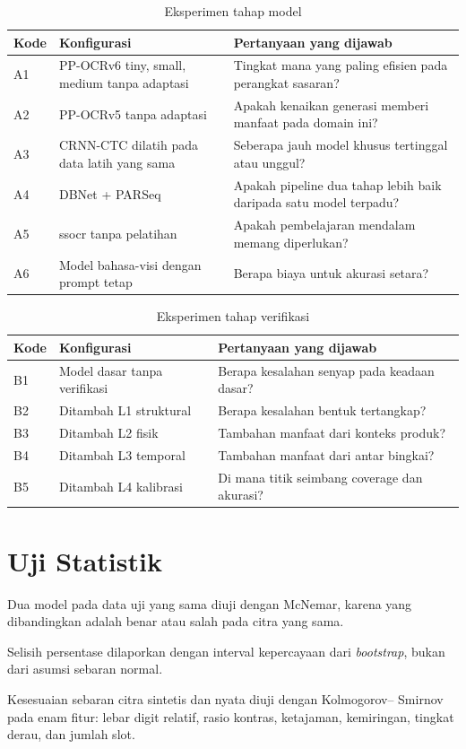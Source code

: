 \documentclass[12pt,a4paper,oneside]{report}
\begin{document}
\begin{table}[H]
\caption{Eksperimen tahap model}
\label{tab:eks-a}
\begin{tabularx}{\textwidth}{@{}L{1.0cm} L{5.6cm} X@{}}
\toprule
\textbf{Kode} & \textbf{Konfigurasi} & \textbf{Pertanyaan yang dijawab} \\
\midrule
A1 & PP-OCRv6 tiny, small, medium tanpa adaptasi & Tingkat mana yang paling efisien pada perangkat sasaran? \\
A2 & PP-OCRv5 tanpa adaptasi & Apakah kenaikan generasi memberi manfaat pada domain ini? \\
A3 & CRNN-CTC dilatih pada data latih yang sama & Seberapa jauh model khusus tertinggal atau unggul? \\
A4 & DBNet + PARSeq & Apakah pipeline dua tahap lebih baik daripada satu model terpadu? \\
A5 & ssocr tanpa pelatihan & Apakah pembelajaran mendalam memang diperlukan? \\
A6 & Model bahasa-visi dengan prompt tetap & Berapa biaya untuk akurasi setara? \\
\bottomrule
\end{tabularx}
\end{table}

\begin{table}[H]
\caption{Eksperimen tahap verifikasi}
\label{tab:eks-b}
\begin{tabularx}{\textwidth}{@{}L{1.0cm} L{5.6cm} X@{}}
\toprule
\textbf{Kode} & \textbf{Konfigurasi} & \textbf{Pertanyaan yang dijawab} \\
\midrule
B1 & Model dasar tanpa verifikasi & Berapa kesalahan senyap pada keadaan dasar? \\
B2 & Ditambah L1 struktural & Berapa kesalahan bentuk tertangkap? \\
B3 & Ditambah L2 fisik & Tambahan manfaat dari konteks produk? \\
B4 & Ditambah L3 temporal & Tambahan manfaat dari antar bingkai? \\
B5 & Ditambah L4 kalibrasi & Di mana titik seimbang coverage dan akurasi? \\
\bottomrule
\end{tabularx}
\end{table}

\section{Uji Statistik}

\begin{poin}
  \item Dua model pada data uji yang sama diuji dengan McNemar, karena yang
        dibandingkan adalah benar atau salah pada citra yang sama.
  \item Selisih persentase dilaporkan dengan interval kepercayaan dari
        \textit{bootstrap}, bukan dari asumsi sebaran normal.
  \item Kesesuaian sebaran citra sintetis dan nyata diuji dengan Kolmogorov--
        Smirnov pada enam fitur: lebar digit relatif, rasio kontras, ketajaman,
        kemiringan, tingkat derau, dan jumlah slot.
\end{poin}
\end{document}

